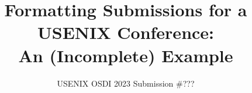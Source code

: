 \documentclass[letterpaper,twocolumn,10pt]{article}
\begin{document}
\date{}

\title{\Large \bf Formatting Submissions for a USENIX Conference:\\
  An (Incomplete) Example}

\author{
	USENIX OSDI 2023 Submission \#??? 
} 

\maketitle











\end{document}
